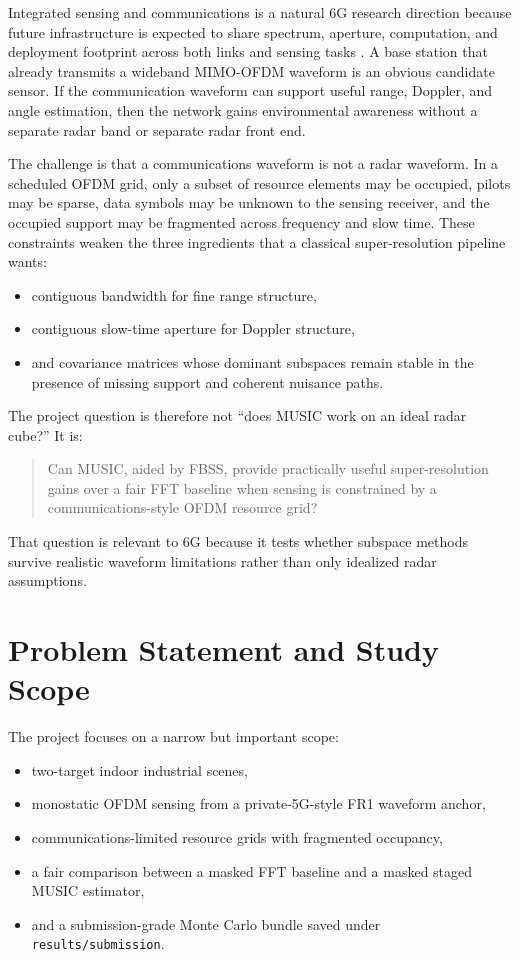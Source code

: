 \documentclass[11pt]{article}
\begin{document}
Integrated sensing and communications is a natural 6G research direction because future infrastructure is expected to share spectrum, aperture, computation, and deployment footprint across both links and sensing tasks \cite{liu2022}. A base station that already transmits a wideband MIMO-OFDM waveform is an obvious candidate sensor. If the communication waveform can support useful range, Doppler, and angle estimation, then the network gains environmental awareness without a separate radar band or separate radar front end.

The challenge is that a communications waveform is not a radar waveform. In a scheduled OFDM grid, only a subset of resource elements may be occupied, pilots may be sparse, data symbols may be unknown to the sensing receiver, and the occupied support may be fragmented across frequency and slow time. These constraints weaken the three ingredients that a classical super-resolution pipeline wants:
\begin{itemize}
  \item contiguous bandwidth for fine range structure,
  \item contiguous slow-time aperture for Doppler structure,
  \item and covariance matrices whose dominant subspaces remain stable in the presence of missing support and coherent nuisance paths.
\end{itemize}

The project question is therefore not ``does MUSIC work on an ideal radar cube?'' It is:
\begin{quote}
Can MUSIC, aided by FBSS, provide practically useful super-resolution gains over a fair FFT baseline when sensing is constrained by a communications-style OFDM resource grid?
\end{quote}

That question is relevant to 6G because it tests whether subspace methods survive realistic waveform limitations rather than only idealized radar assumptions.

\section{Problem Statement and Study Scope}

The project focuses on a narrow but important scope:
\begin{itemize}
  \item two-target indoor industrial scenes,
  \item monostatic OFDM sensing from a private-5G-style FR1 waveform anchor,
  \item communications-limited resource grids with fragmented occupancy,
  \item a fair comparison between a masked FFT baseline and a masked staged MUSIC estimator,
  \item and a submission-grade Monte Carlo bundle saved under \texttt{results/submission}.
\end{itemize}
\end{document}
